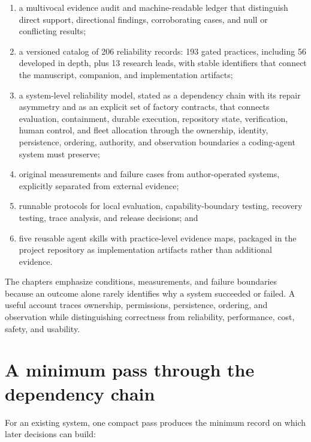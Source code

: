 \begin{enumerate}
\def\labelenumi{\arabic{enumi}.}
\tightlist
\item
  a multivocal evidence audit and machine-readable ledger that distinguish direct support, directional findings, corroborating cases, and null or conflicting results;
\item
  a versioned catalog of 206 reliability records: 193 gated practices, including 56 developed in depth, plus 13 research leads, with stable identifiers that connect the manuscript, companion, and implementation artifacts;
\item
  a system-level reliability model, stated as a dependency chain with its repair asymmetry and as an explicit set of factory contracts, that connects evaluation, containment, durable execution, repository state, verification, human control, and fleet allocation through the ownership, identity, persistence, ordering, authority, and observation boundaries a coding-agent system must preserve;
\item
  original measurements and failure cases from author-operated systems, explicitly separated from external evidence;
\item
  runnable protocols for local evaluation, capability-boundary testing, recovery testing, trace analysis, and release decisions; and
\item
  five reusable agent skills with practice-level evidence maps, packaged in the project repository as implementation artifacts rather than additional evidence.
\end{enumerate}

The chapters emphasize conditions, measurements, and failure boundaries because an outcome alone rarely identifies why a system succeeded or failed. A useful account traces ownership, permissions, persistence, ordering, and observation while distinguishing correctness from reliability, performance, cost, safety, and usability.

\hypertarget{a-minimum-pass-through-the-dependency-chain}{%
\section{A minimum pass through the dependency chain}\label{a-minimum-pass-through-the-dependency-chain}}


For an existing system, one compact pass produces the minimum record on which later decisions can build:

